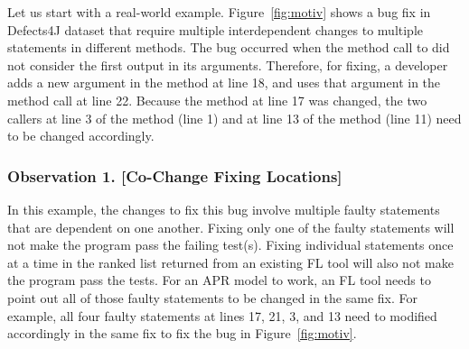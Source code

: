 Let us start with a real-world example.
Figure~\ref{fig:motiv} shows a bug fix in Defects4J dataset that
require multiple interdependent changes to multiple statements in
different methods. The bug occurred when the method call to
 did not consider the first output in its
arguments. Therefore, for fixing, a developer adds a new argument in
the method  at line 18, and uses that argument in the
method call  at line
22. Because the method  at line 17 was changed, the two
callers at line 3 of the method  (line 1) and at line
13 of the method  (line 11) need to be changed
accordingly.






\subsubsection{{\bf Observation 1. [Co-Change Fixing Locations]}}
In this example, the changes to fix this bug involve multiple faulty
statements that are dependent on one another. Fixing only one of the
faulty statements will not make the program pass the failing
test(s). Fixing individual statements once at a time in the ranked
list returned from an existing FL tool will also not make the program
pass the tests. For an APR model to work, an FL tool needs to point
out all of those faulty statements to be changed in the same fix.  For
example, all four faulty statements at lines 17, 21, 3, and 13 need to
modified accordingly in the same fix to fix the bug in
Figure~\ref{fig:motiv}.

